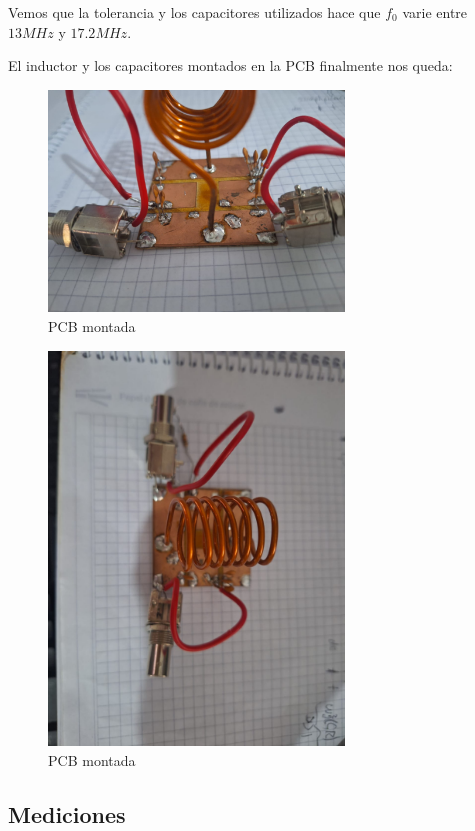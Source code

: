 Vemos que la tolerancia y los capacitores utilizados hace que $f_0$ varie entre $13 MHz$ y $17.2 MHz$.


El inductor y los capacitores montados en la PCB finalmente nos queda:

\begin{figure}[h]
    \centering
    \includegraphics[width=0.7\textwidth]{Imagenes/pcb1.jpeg}
    \caption{PCB montada}
\end{figure}

\begin{figure}[h]
    \centering
    \includegraphics[width=0.7\textwidth]{Imagenes/pcb2.jpeg}
    \caption{PCB montada}
\end{figure}


\newpage
\subsection{Mediciones}

